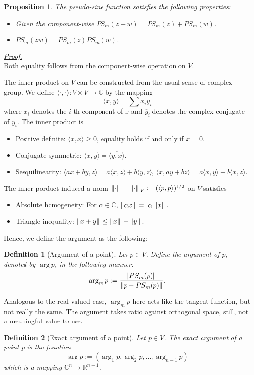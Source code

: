 \documentclass[12pt]{article}
\newcommand{\innerprod}[2]{\langle{#1},{#2}\rangle}
\newtheorem*{definition}{Definition}
\newtheorem*{proposition}{Proposition}
\renewenvironment{proof}[1][Proof]{\begin{snugshade*} \underline{\textit{{#1}.}}\\}{\hfill \qedsymbol \end{snugshade*}}
\begin{document}
    \begin{proposition}
        The pseudo-sine function satisfies the following properties:
        \begin{itemize}
            \item Given the component-wise $PS_m(z+w)=PS_m(z)+PS_m(w)$.
            \item $PS_m(zw)=PS_m(z)PS_m(w)$.
        \end{itemize}
    \end{proposition}

    \begin{proof}
        Both equality follows from the component-wise operation on $V$.
    \end{proof}

    The inner product on $V$ can be constructed from the usual sense of complex group. We define $\innerprod{\cdot}{\cdot}:V\times V\to\mathbb{C}$ by the mapping \[\innerprod{x}{y}=\sum x_i \overline{y}_i\] where $x_i$ denotes the $i$-th component of $x$ and $\overline{y}_i$ denotes the complex conjugate of $y_i$. The inner product is \begin{itemize}
        \item Positive definite: $\innerprod{x}{x}\geq 0$, equality holds if and only if $x=0$.
        \item Conjugate symmetric: $\innerprod{x}{y}=\overline{\innerprod{y}{x}}$.
        \item Sesquilinearity: $\innerprod{ax+by}{z}=a\innerprod{x}{z}+b\innerprod{y}{z}$, $\innerprod{x}{ay+bz}=\overline{a}\innerprod{x}{y}+\overline{b}\innerprod{x}{z}$. 
    \end{itemize}
    The inner porduct induced a norm $\norm*{\cdot}=\norm*{\cdot}_V:=(\innerprod{p}{p})^{1/2}$ on $V$ satisfies \begin{itemize}
        \item Absolute homogeneity: For $\alpha\in\mathbb{C}$, $\norm*{\alpha x}=\abs{\alpha}\norm*{x}$.
        \item Triangle inequality: $\norm*{x+y}\leq \norm*{x}+\norm*{y}$.
    \end{itemize}

    Hence, we define the argument as the following:

    \begin{definition}[Argument of a point]
        Let $p\in V$. Define the argument of $p$, denoted by $\arg{p}$, in the following manner: \[\arg_m{p}:=\frac{\norm*{PS_m(p)}}{\norm{p-PS_m(p)}}.\]
    \end{definition}

    Analogous to the real-valued case, $\arg_m{p}$ here acts like the tangent function, but not really the same. The argument takes ratio against orthogonal space, still, not a meaningful value to use.

    \begin{definition}[Exact argument of a point]
        Let $p\in V$. The exact argument of a point $p$ is the function \[\arg{p}:=(\arg_1{p},\arg_2{p},\dots,\arg_{n-1}{p})\] which is a mapping $\mathbb{C}^n\to\mathbb{R}^{n-1}$.
    \end{definition}
\end{document}
